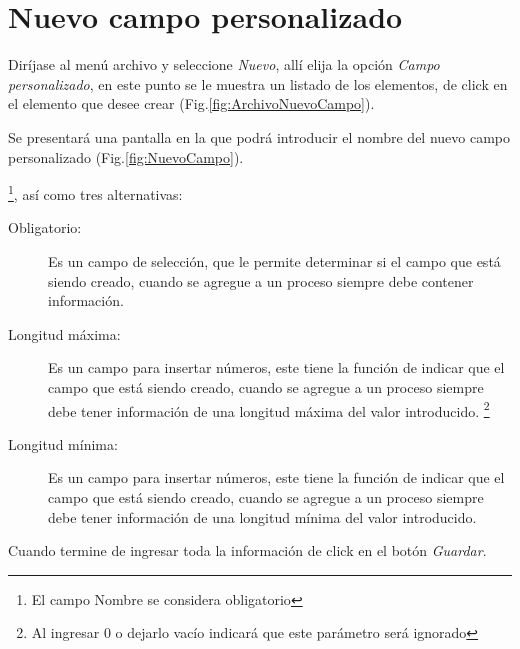 \section{Nuevo campo personalizado}
\label{sec:nuevoCampo}
Dir\'ijase al men\'u archivo y seleccione \emph{Nuevo}, all\'i elija la opci\'on \emph{Campo personalizado}, en este punto se le muestra un listado de los elementos, de click en el elemento que desee crear (Fig.\ref{fig:ArchivoNuevoCampo}). 
  

Se presentar\'a una pantalla en la que podr\'a introducir el nombre del nuevo
campo personalizado (Fig.\ref{fig:NuevoCampo}). 
  

\footnote{El campo Nombre se considera obligatorio},
as\'i como tres
alternativas:
\begin{description}
\item[Obligatorio:]Es un campo de selecci\'on, que le permite determinar si el
campo que est\'a siendo creado, cuando se agregue a un proceso siempre
debe contener informaci\'on.
\item[Longitud m\'axima:]Es un campo para insertar n\'umeros, este tiene la
funci\'on de indicar que el campo que est\'a siendo creado, cuando se agregue a un proceso siempre debe tener informaci\'on de una longitud
m\'axima del valor introducido.
\footnote{Al ingresar 0 o dejarlo vac\'io indicar\'a que este par\'ametro
ser\'a ignorado}
\item[Longitud m\'inima:]Es un campo para insertar n\'umeros, este tiene la
funci\'on de indicar que el campo que est\'a siendo creado, cuando se agregue a un proceso siempre debe tener informaci\'on de una longitud
m\'inima del valor introducido.
\footnotemark[\value{footnote}]
\end{description}

Cuando termine de ingresar toda la informaci\'on de click en el bot\'on \emph{Guardar}.